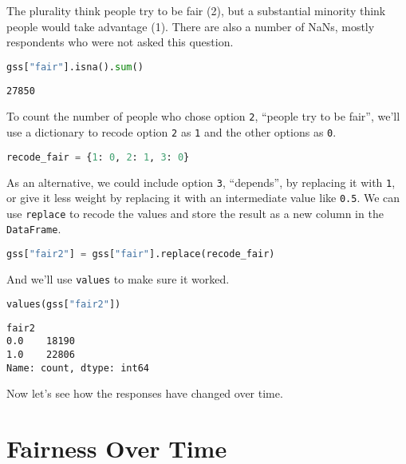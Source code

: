 The plurality think people try to be fair (2), but a substantial
minority think people would take advantage (1). There are also a number
of NaNs, mostly respondents who were not asked this question.

\begin{lstlisting}[language=Python,style=source]
gss["fair"].isna().sum()
\end{lstlisting}

\begin{lstlisting}[style=output]
27850
\end{lstlisting}

To count the number of people who chose option
\passthrough{\lstinline!2!}, ``people try to be fair'', we'll use a
dictionary to recode option \passthrough{\lstinline!2!} as
\passthrough{\lstinline!1!} and the other options as
\passthrough{\lstinline!0!}.

\begin{lstlisting}[language=Python,style=source]
recode_fair = {1: 0, 2: 1, 3: 0}
\end{lstlisting}

As an alternative, we could include option \passthrough{\lstinline!3!},
``depends'', by replacing it with \passthrough{\lstinline!1!}, or give
it less weight by replacing it with an intermediate value like
\passthrough{\lstinline!0.5!}. We can use
\passthrough{\lstinline!replace!} to recode the values and store the
result as a new column in the \passthrough{\lstinline!DataFrame!}.

\begin{lstlisting}[language=Python,style=source]
gss["fair2"] = gss["fair"].replace(recode_fair)
\end{lstlisting}

And we'll use \passthrough{\lstinline!values!} to make sure it worked.

\begin{lstlisting}[language=Python,style=source]
values(gss["fair2"])
\end{lstlisting}

\begin{lstlisting}[style=output]
fair2
0.0    18190
1.0    22806
Name: count, dtype: int64
\end{lstlisting}

Now let's see how the responses have changed over time.

\hypertarget{fairness-over-time}{%
\section{Fairness Over Time}\label{fairness-over-time}}

